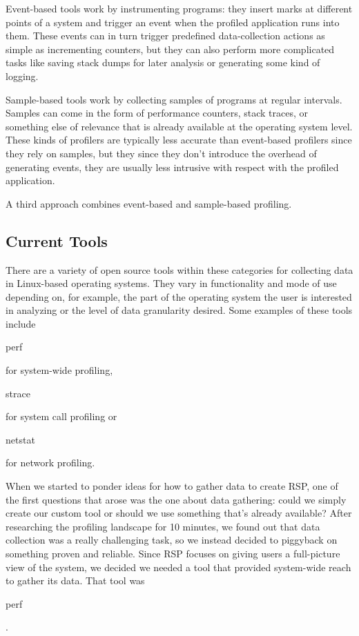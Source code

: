 \documentclass[10pt]{article}
\begin{document}
Event-based tools work by instrumenting programs: they insert marks at different points of a system and trigger an event when the profiled application runs into them. These events can in turn trigger predefined data-collection actions as simple as incrementing counters, but they can also perform more complicated tasks like saving stack dumps for later analysis or generating some kind of logging.

Sample-based tools work by collecting samples of programs at regular intervals.  Samples can come in the form of performance counters, stack traces, or something else of relevance that is already available at the operating system level. These kinds of profilers are typically less accurate than event-based profilers since they rely on samples, but they since they don't introduce the overhead of generating events, they are usually less intrusive with respect with the profiled application.

A third approach combines event-based and sample-based profiling.

\subsection{Current Tools}

There are a variety of open source tools within these categories for collecting data in Linux-based operating systems. They vary in functionality and mode of use depending on, for example, the part of the operating system the user is interested in analyzing or the level of data granularity desired. Some examples of these tools include \begin{tt}perf\end{tt} for system-wide profiling, \begin{tt}strace\end{tt} for system call profiling or \begin{tt}netstat\end{tt} for network profiling.

When we started to ponder ideas for how to gather data to create RSP, one of the first questions that arose was the one about data gathering: could we simply create our custom tool or should we use something that's already available? After researching the profiling landscape for 10 minutes, we found out that data collection was a really challenging task, so we instead decided to piggyback on something proven and reliable. Since RSP focuses on giving users a full-picture view of the system, we decided we needed a tool that provided system-wide reach to gather its data. That tool was \begin{tt}perf\end{tt}.
\end{document}

